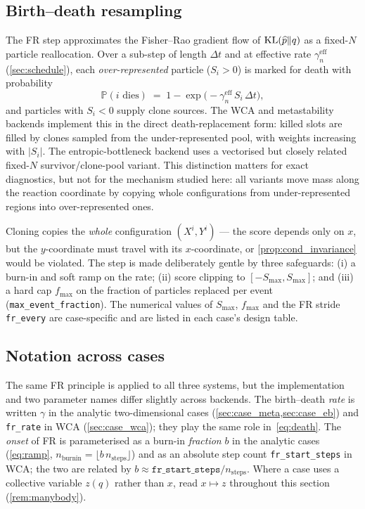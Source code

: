 \subsection{Birth--death resampling}
The FR step approximates the Fisher--Rao gradient flow of
$\mathrm{KL}(\widehat{p}\Vert q)$ as a fixed-$N$ particle reallocation. Over a sub-step
of length $\Delta t$ and at effective rate $\gamma_n^{\mathrm{eff}}$
(\cref{sec:schedule}), each \emph{over-represented} particle ($S_i>0$) is marked
for death with probability
\begin{equation}
  \mathbb P(\text{$i$ dies}) \;=\; 1-\exp\!\bigl(-\gamma_n^{\mathrm{eff}}\,S_i\,\Delta t\bigr),
  \label{eq:death}
\end{equation}
and particles with $S_i<0$ supply clone sources. The WCA and metastability
backends implement this in the direct death-replacement form: killed slots are
filled by clones sampled from the under-represented pool, with weights increasing
with $|S_i|$. The entropic-bottleneck backend uses a vectorised but closely
related fixed-$N$ survivor/clone-pool variant. This distinction matters for exact
diagnostics, but not for the mechanism studied here: all variants move mass along
the reaction coordinate by copying whole configurations from under-represented
regions into over-represented ones.

Cloning copies the \emph{whole} configuration $(X^i,Y^i)$ --- the score depends
only on $x$, but the $y$-coordinate must travel with its $x$-coordinate, or
\cref{prop:cond_invariance} would be violated. The step is made deliberately
gentle by three safeguards: (i) a burn-in and soft ramp on the rate; (ii) score
clipping to $[-S_{\max},S_{\max}]$; and (iii) a hard cap $f_{\max}$ on the
fraction of particles replaced per event (\texttt{max\_event\_fraction}). The
numerical values of $S_{\max}$, $f_{\max}$ and the FR stride
\texttt{fr\_every} are case-specific and are listed in each case's design table.

\subsection{Notation across cases}
\label{sec:fr_notation}
The same FR principle is applied to all three systems, but the implementation and
two parameter names differ slightly across backends. The birth--death \emph{rate}
is written $\gamma$ in the analytic two-dimensional cases
(\cref{sec:case_meta,sec:case_eb}) and \texttt{fr\_rate} in WCA
(\cref{sec:case_wca}); they play the same role in~\eqref{eq:death}. The
\emph{onset} of FR is parameterised as a burn-in \emph{fraction} $b$ in the
analytic cases (\eqref{eq:ramp}, $n_{\mathrm{burnin}}=\lfloor b\,
n_{\mathrm{steps}}\rfloor$) and as an absolute step count
\texttt{fr\_start\_steps} in WCA; the two are related by
$b\approx\texttt{fr\_start\_steps}/n_{\mathrm{steps}}$. Where a case uses a
collective variable $z(q)$ rather than $x$, read $x\mapsto z$ throughout this
section (\cref{rem:manybody}).

